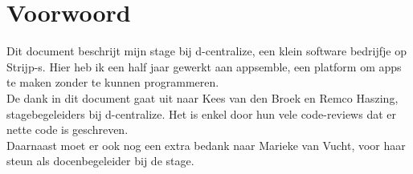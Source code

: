 \chapter{Voorwoord}
Dit document beschrijt mijn stage bij d-centralize, een klein software bedrijfje op Strijp-s. Hier heb ik een half jaar gewerkt aan appsemble, een platform om apps te maken zonder te kunnen programmeren. \\

De dank in dit document gaat uit naar Kees van den Broek en Remco Haszing, stagebegeleiders bij d-centralize. Het is enkel door hun vele code-reviews dat er nette code is geschreven. \\

Daarnaast moet er ook nog een extra bedank naar Marieke van Vucht, voor haar steun als docenbegeleider bij de stage.